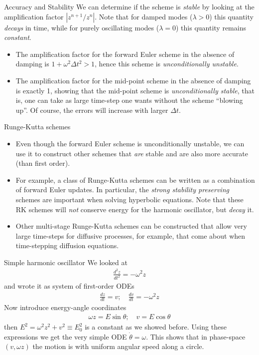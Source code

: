 \documentclass[pdf]{beamer}
\theoremstyle{definition}
\begin{document}
\begin{frame}{Accuracy and Stability}
  We can determine if the scheme is \emph{stable} by looking at the
  amplification factor $| z^{n+1}/z^n|$. Note that for damped modes
  ($\lambda>0$) this quantity \emph{decays} in time, while for purely
  oscillating modes ($\lambda = 0$) this quantity remains
  \emph{constant}.

  
  \begin{itemize}
  \item The amplification factor for the forward Euler scheme in the
    absence of damping is $1+\omega^2\Delta t^2 > 1$, hence this
    scheme is \emph{unconditionally unstable}.
  \item The amplification factor for the mid-point scheme in the
    absence of damping is exactly 1, showing that the mid-point scheme
    is \emph{unconditionally stable}, that is, one can take as large
    time-step one wants without the scheme ``blowing up''. Of course,
    the errors will increase with larger $\Delta t$.
  \end{itemize}
\end{frame}

\begin{frame}{Runge-Kutta schemes}
  \begin{itemize}
  \item Even though the forward Euler scheme is unconditionally
    unstable, we can use it to construct other schemes that \emph{are}
    stable and are also more accurate (than first order).
  \item For example, a class of Runge-Kutta schemes can be written as
    a combination of forward Euler updates. In particular, the
    \emph{strong stability preserving} schemes are important when
    solving hyperbolic equations. Note that these RK schemes will
    \emph{not} conserve energy for the harmonic oscillator, but
    \emph{decay} it.
  \item Other multi-stage Runge-Kutta schemes can be constructed that
    allow very large time-steps for diffusive processes, for example,
    that come about when time-stepping diffusion equations.
  \end{itemize}
\end{frame}

\begin{frame}{Simple harmonic oscillator}
  We looked at
  \begin{align*}
    \frac{d^2z}{dt^2} = -\omega^2 z
  \end{align*}
  and wrote it as system of first-order ODEs
  \begin{align*}
    \frac{dz}{dt} = v; \quad \frac{dv}{dt} = -\omega^2 z
  \end{align*}
  Now introduce energy-angle coordinates
  \begin{align*}
    \omega z = E\sin\theta; \quad v = E\cos\theta
  \end{align*}
  then $E^2 = \omega^2 z^2 + v^2 \equiv E_0^2$ is a constant as we
  showed before. Using these expressions we get the very simple ODE
  $\dot{\theta} = \omega$. This shows that in phase-space
  $(v,\omega z)$ the motion is with uniform angular speed along a
  circle.
\end{frame}
\end{document}
